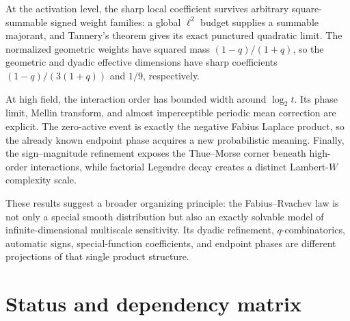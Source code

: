 \documentclass[11pt,oneside]{article}
\theoremstyle{definition}
\theoremstyle{remark}
\begin{document}
At the activation level, the sharp local coefficient survives arbitrary
square-summable signed weight families: a global $\ell^2$ budget supplies a
summable majorant, and Tannery's theorem gives its exact punctured quadratic
limit.  The normalized geometric weights have squared mass
$(1-q)/(1+q)$, so the geometric and dyadic effective dimensions have sharp
coefficients $(1-q)/(3(1+q))$ and $1/9$, respectively.

At high field, the interaction order has bounded width around $\log_2t$.  Its
phase limit, Mellin transform, and almost imperceptible periodic mean correction
are explicit.  The zero-active event is exactly the negative Fabius Laplace
product, so the already known endpoint phase acquires a new probabilistic
meaning.  Finally, the sign--magnitude refinement exposes the Thue--Morse
corner beneath high-order interactions, while factorial Legendre decay creates
a distinct Lambert-$W$ complexity scale.

These results suggest a broader organizing principle: the Fabius--Rvachev law
is not only a special smooth distribution but also an exactly solvable model
of infinite-dimensional multiscale sensitivity.  Its dyadic refinement,
$q$-combinatorics, automatic signs, special-function coefficients, and endpoint
phases are different projections of that single product structure.

\appendix

\section{Status and dependency matrix}
\label{app:status}
\end{document}
